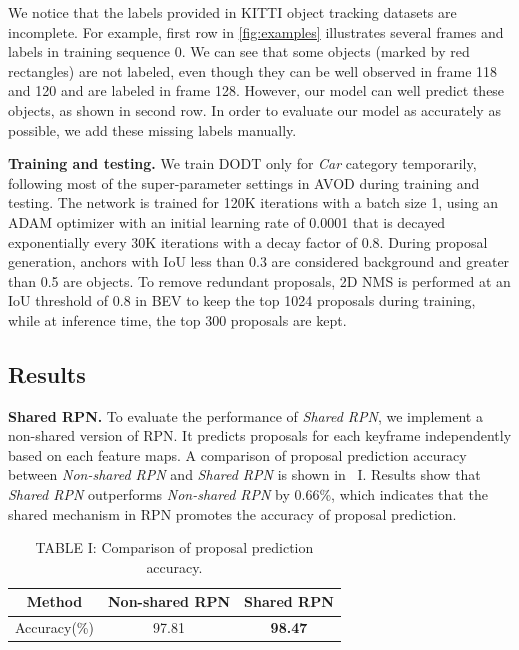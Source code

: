 \documentclass[letterpaper, 10pt, conference]{ieeeconf}  %
\begin{document}
We notice that the labels provided in KITTI object tracking datasets are incomplete. For example, first row in \figurename \ref{fig:examples} illustrates several frames and labels in training sequence 0. We can see that some objects (marked by red rectangles) are not labeled, even though they can be well observed in frame 118 and 120 and are labeled in frame 128. However, our model can well predict these objects, as shown in second row. In order to evaluate our model as accurately as possible, we add these missing labels manually.

\textbf{Training and testing.} We train DODT only for \textit{Car} category temporarily, following most of the super-parameter settings in AVOD \cite{ku2018joint} during training and testing. The network is trained for 120K iterations with a batch size 1, using an ADAM \cite{kingma2014adam} optimizer with an initial learning rate of 0.0001 that is decayed exponentially every 30K iterations with a decay factor of 0.8. During proposal generation, anchors with IoU less than 0.3 are considered background and greater than 0.5 are objects. To remove redundant proposals, 2D NMS is performed at an IoU threshold of 0.8 in BEV to keep the top 1024 proposals during training, while at inference time, the top 300 proposals are kept. 

\subsection{Results}
\textbf{Shared RPN.} To evaluate the performance of \textit{Shared RPN}, we implement a non-shared version of RPN. It predicts proposals for each keyframe independently based on each feature maps. A comparison of proposal prediction accuracy between \textit{Non-shared RPN} and \textit{Shared RPN} is shown in \tablename \, I. Results show that \textit{Shared RPN} outperforms \textit{Non-shared RPN} by 0.66\%, which indicates that the shared mechanism in RPN promotes the accuracy of proposal prediction. 
\begin{table}[h]\centering
	\vspace{-0.5cm}
		\begin{tabular}{ccc}
			\toprule[1pt]
			Method        & Non-shared RPN & Shared RPN  \\ \midrule
			Accuracy(\%)  & 97.81      & \textbf{98.47}       \\
			\bottomrule[1pt]
	\end{tabular}
	\caption*{TABLE I: Comparison of proposal prediction accuracy.}
	\label{table:rpn_result}
	\vspace{-0.4cm}
\end{table}
\end{document}
